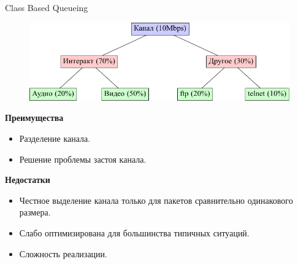 \documentclass[12pt]{beamer}
\begin{document}
\begin{frame}{Class Based Queueing}
	\begin{figure}
		\center
    	\includegraphics[scale=0.6]{../text/src/pdfimages/cbq.pdf}
	\end{figure}


	\begin{center}
        {\footnotesize
            \begin{multicols}{2}
				{\bf Преимущества}
				\begin{itemize}
					\item Разделение канала.						  
					\item Решение проблемы застоя канала.
				\end{itemize}
            \columnbreak
				{\bf Недостатки}
				\begin{itemize}
					\item Честное выделение канала только для пакетов сравнительно одинакового размера.
					\item Слабо оптимизирована для большинства типичных ситуаций.
					\item Сложность реализации.
				\end{itemize}
            \end{multicols}
        }
	\end{center}
\end{frame}
\end{document}

